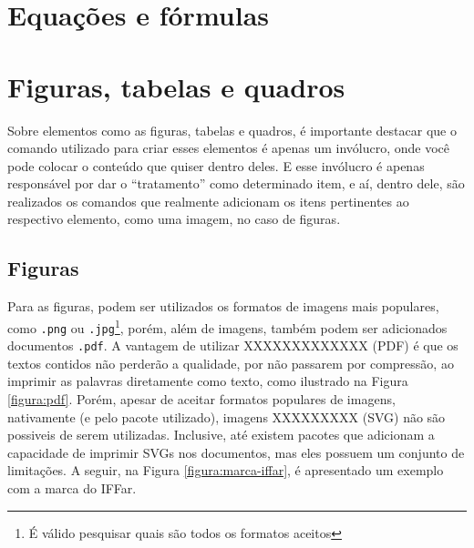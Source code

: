 
\section{Equações e fórmulas}

\section{Figuras, tabelas e quadros}
  Sobre elementos como as figuras, tabelas e quadros, é importante destacar que o comando utilizado para criar esses elementos é apenas um invólucro, onde você pode colocar o conteúdo que quiser dentro deles. E esse invólucro é apenas responsável por dar o ``tratamento'' como determinado item, e aí, dentro dele, são realizados os comandos que realmente adicionam os itens pertinentes ao respectivo elemento, como uma imagem, no caso de figuras.
  
\subsection{Figuras}
  Para as figuras, podem ser utilizados os formatos de imagens mais populares, como \verb|.png| ou \verb|.jpg|\footnote{É válido pesquisar quais são todos os formatos aceitos}, porém, além de imagens, também podem ser adicionados documentos \verb|.pdf|. A vantagem de utilizar XXXXXXXXXXXXX (PDF) é que os textos contidos não perderão a qualidade, por não passarem por compressão, ao imprimir as palavras diretamente como texto, como ilustrado na Figura \ref{figura:pdf}. Porém, apesar de aceitar formatos populares de imagens, nativamente (e pelo pacote utilizado), imagens XXXXXXXXX (SVG) não são possiveis de serem utilizadas. Inclusive, até existem pacotes que adicionam a capacidade de imprimir SVGs nos documentos, mas eles possuem um conjunto de limitações\footnotemark. A seguir, na Figura \ref{figura:marca-iffar}, é apresentado um exemplo com a marca do IFFar.


